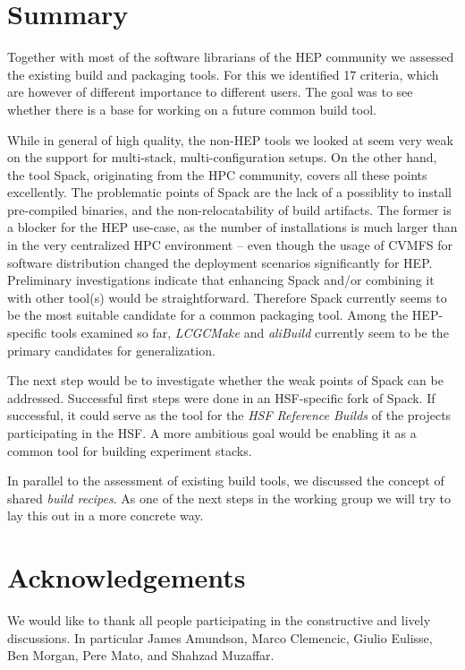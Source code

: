 \documentclass[12pt,a4paper]{article}
\begin{document}
\section{Summary}
Together with most of the software librarians of the HEP community we assessed the existing build and packaging tools. For this we identified 17 criteria, which are however of different importance to different users. The goal was to see whether there is a base for working on a future common build tool.

While in general of high quality, the non-HEP tools we looked at seem very weak on the support for multi-stack, multi-configuration setups. On the other hand, the tool Spack, originating from the HPC community, covers all these points excellently. The problematic points of Spack are the lack of a possiblity to install pre-compiled binaries, and the non-relocatability of build artifacts. The former is a blocker for the HEP use-case, as the number of installations is much larger than in the very centralized HPC environment -- even though the usage of CVMFS for software distribution changed the deployment scenarios significantly for HEP. Preliminary investigations indicate that enhancing Spack and/or combining it with other tool(s) would be straightforward. Therefore Spack currently seems to be the most suitable candidate for a common packaging tool. Among the HEP-specific tools examined so far, \emph{LCGCMake} and \emph{aliBuild} currently seem to be the primary candidates for generalization.

The next step would be to investigate whether the weak points of Spack can be addressed. Successful first steps were done in an HSF-specific fork of Spack. If successful, it could serve as the tool for the \emph{HSF Reference Builds} of the projects participating in the HSF. A more ambitious goal would be enabling it as a common tool for building experiment stacks.

In parallel to the assessment of existing build tools, we discussed the concept of shared \emph{build recipes}. As one of the next steps in the working group we will try to lay this out in a more concrete way.

\section*{Acknowledgements}
We would like to thank all people participating in the constructive and lively discussions. In particular James Amundson, Marco Clemencic, Giulio Eulisse, Ben Morgan, Pere Mato, and Shahzad Muzaffar.
\end{document}
